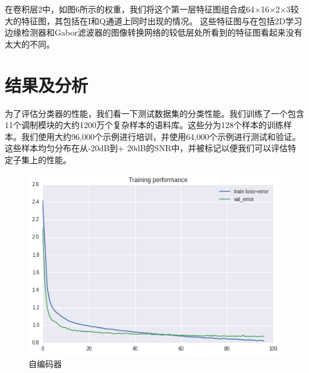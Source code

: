 在卷积层2中，如图6所示的权重，我们将这个第一层特征图组合成64×16×2×3较大的特征图，其包括在I和Q通道上同时出现的情况。 这些特征图与在包括2D学习边缘检测器和Gabor滤波器的图像转换网络的较低层处所看到的特征图看起来没有太大的不同。\par


\section{结果及分析}
为了评估分类器的性能，我们看一下测试数据集的分类性能。我们训练了一个包含11个调制模块的大约1200万个复杂样本的语料库。这些分为128个样本的训练样本。我们使用大约96,000个示例进行培训，并使用64,000个示例进行测试和验证。 这些样本均匀分布在从-20dB到+ 20dB的SNR中，并被标记以便我们可以评估特定子集上的性能。\par
\begin{figure}[!h]
	\centering
	\includegraphics[scale=0.3]{figures/chapter_3/loss}
	\caption{自编码器}	\label{fig_3_2}
\end{figure}


